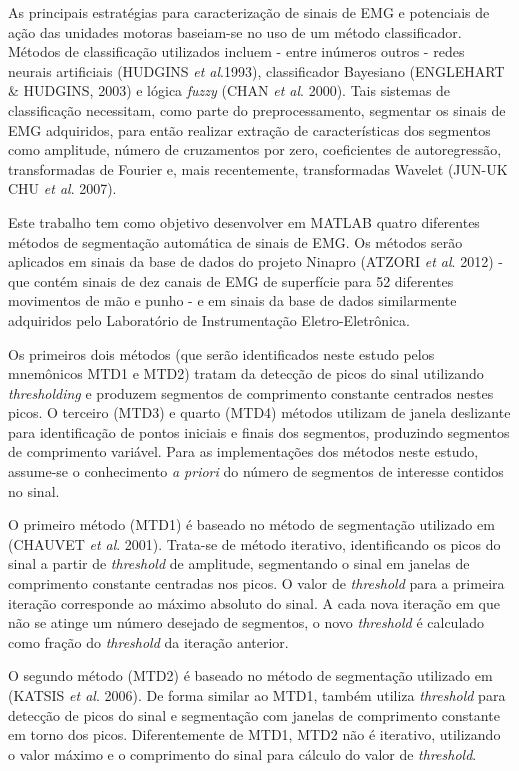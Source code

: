 \documentclass[
	12pt,				%
	openright,			%
	oneside,			%
	a4paper,			%
	english,			%
	francais,			%
	spanish,			%
	brazil				%
	]{abntex2}
\begin{document}
As principais estratégias para caracterização de sinais de EMG e potenciais de ação das unidades motoras baseiam-se no uso de um método classificador. Métodos de classificação utilizados incluem - entre inúmeros outros - redes neurais artificiais (HUDGINS \emph{et al}.1993), classificador Bayesiano (ENGLEHART \& HUDGINS, 2003) e lógica \emph{fuzzy} (CHAN \emph{et al}. 2000). Tais sistemas de classificação necessitam, como parte do preprocessamento, segmentar os sinais de EMG adquiridos, para então realizar extração de características dos segmentos como amplitude, número de cruzamentos por zero, coeficientes de autoregressão, transformadas de Fourier e, mais recentemente, transformadas Wavelet (JUN-UK CHU \emph{et al}. 2007). 

Este trabalho tem como objetivo desenvolver em MATLAB quatro diferentes métodos de segmentação automática de sinais de EMG. Os métodos serão aplicados em sinais da base de dados do projeto Ninapro (ATZORI \emph{et al}. 2012) - que contém sinais de dez canais de EMG de superfície para 52 diferentes movimentos de mão e punho - e em sinais da base de dados similarmente adquiridos pelo Laboratório de Instrumentação Eletro-Eletrônica.

Os primeiros dois métodos (que serão identificados neste estudo pelos mnemônicos MTD1 e MTD2) tratam da detecção de picos do sinal utilizando \emph{thresholding} e produzem segmentos de comprimento constante centrados nestes picos. O terceiro (MTD3) e quarto (MTD4) métodos utilizam de janela deslizante para identificação de pontos iniciais e finais dos segmentos, produzindo segmentos de comprimento variável. Para as implementações dos métodos neste estudo, assume-se o conhecimento \emph{a priori} do número de segmentos de interesse contidos no sinal.

O primeiro método (MTD1) é baseado no método de segmentação utilizado em (CHAUVET \emph{et al}. 2001). Trata-se de método iterativo, identificando os picos do sinal a partir de \emph{threshold} de amplitude, segmentando o sinal em janelas de comprimento constante centradas nos picos. O valor de \emph{threshold} para a primeira iteração corresponde ao máximo absoluto do sinal. A cada nova iteração em que não se atinge um número desejado de segmentos, o novo \emph{threshold} é calculado como fração do \emph{threshold} da iteração anterior.

O segundo método (MTD2) é baseado no método de segmentação utilizado em (KATSIS \emph{et al}. 2006). De forma similar ao MTD1, também utiliza \emph{threshold} para detecção de picos do sinal e segmentação com janelas de comprimento constante em torno dos picos. Diferentemente de MTD1, MTD2 não é iterativo, utilizando o valor máximo e o comprimento do sinal para cálculo do valor de \emph{threshold}.
\end{document}
